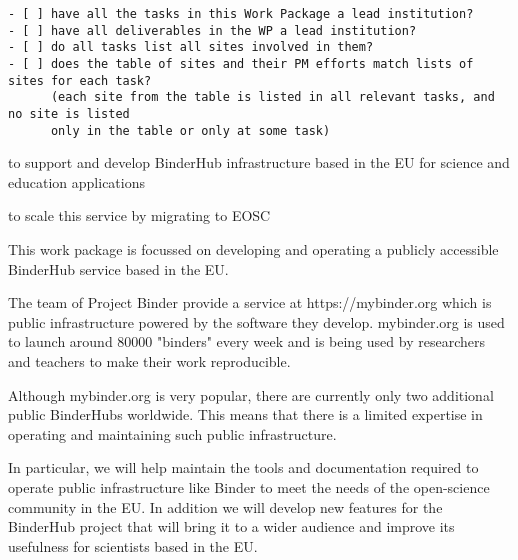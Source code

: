 \begin{draft}
\begin{verbatim}
- [ ] have all the tasks in this Work Package a lead institution?
- [ ] have all deliverables in the WP a lead institution?
- [ ] do all tasks list all sites involved in them?
- [ ] does the table of sites and their PM efforts match lists of sites for each task?
      (each site from the table is listed in all relevant tasks, and no site is listed
      only in the table or only at some task)
\end{verbatim}
\end{draft}

\begin{workpackage}[id=eosc,wphases=0-48,swsites,
  title=Services and EOSC Integration,
  short=EOSC,
  lead=WTT,
  EGIRM=12,
  EPRM=6,
  SRLRM=18,
  UPSUDRM=0,
  WTTRM=13,
  XFELRM=6,
  EPRM=10,
]
\begin{wpobjectives}
 \begin{compactitem}
   \item to support and develop BinderHub infrastructure based in the EU for
     science and education applications
   \item to scale this service by migrating to EOSC
 \end{compactitem}
\end{wpobjectives}

\begin{wpdescription}

This work package is focussed on developing and operating a publicly accessible
BinderHub service based in the EU.

The team of Project Binder provide a service at https://mybinder.org
which is public infrastructure powered by the software they develop.
mybinder.org is used to launch around 80000 "binders" every week and is
being used by researchers and teachers to make their work reproducible.

Although mybinder.org is very popular, there are currently only two
additional public BinderHubs worldwide. This means that there is a limited
expertise in operating and maintaining such public infrastructure.

In particular, we will help maintain the tools and documentation required
to operate public infrastructure like Binder to meet the needs of the
open-science community in the EU. In addition we will develop new features
for the BinderHub project that will bring it to a wider audience and improve
its usefulness for scientists based in the EU.


\end{wpdescription}
\end{workpackage}

